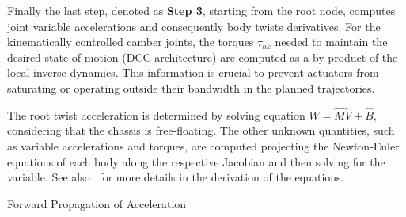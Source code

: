 Finally the last step, denoted as \textbf{Step 3}, starting from the root node, computes joint variable accelerations and consequently body twists derivatives. For the kinematically controlled camber joints, the torques $\tau_{hk}$ needed to maintain the desired state of motion (DCC architecture) are computed as a by-product of the local inverse dynamics. This information is crucial to prevent actuators from  saturating or operating outside their bandwidth in the planned trajectories.

The root twist acceleration is determined by solving equation $W=\hat{M}\dot{V}+\hat{B}$, considering that the chassis is free-floating. The other unknown quantities, such as variable accelerations and torques, are computed projecting the Newton-Euler equations of each body along the respective Jacobian and then solving for the variable. See also~\cite{Domenighini:Designs:2023} for more details in the derivation of the equations.

\begin{algorithm}[h]
	\caption{Forward Propagation of Acceleration}\label{alg:step3}
	\begin{algorithmic}[1]
		\vspace{1mm}
		\vspace{1mm}
		\vspace{1mm}
		\vspace{1mm}
		\vspace{1mm}
		\vspace{1mm}
		\vspace{1mm}
		\vspace{1mm}
		\EndFor
		\vspace{1mm}
	\end{algorithmic}
\end{algorithm}

